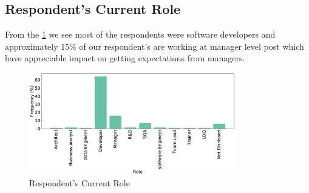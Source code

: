 \subsection{Respondent's Current Role}
From the \cref{fig:role} we see most of the respondents were software developers and approximately 15\% of our respondent's are working at manager level post which have appreciable impact on getting expectations from managers.
\begin{figure}[H]
\centering
  \includegraphics[width=0.8\textwidth]{Figures/Respondents_Role}
  \caption{Respondent's Current Role}
  \label{fig:role}
\end{figure}